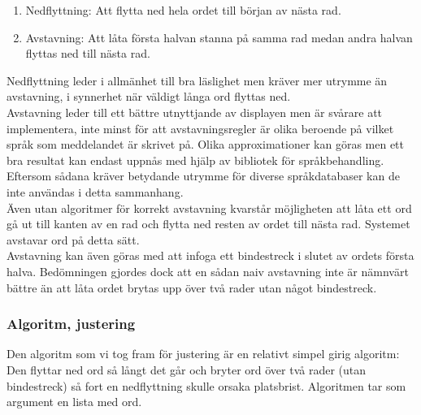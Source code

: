 \documentclass[a4paper,11pt]{article}
\begin{document}
	\begin{enumerate}
    	\item Nedflyttning: Att flytta ned hela ordet till början av nästa rad.
    	\item Avstavning: Att låta första halvan stanna på samma rad medan andra halvan flyttas ned till nästa rad.
	\end{enumerate}

Nedflyttning leder i allmänhet till bra läslighet men kräver mer utrymme än avstavning, i synnerhet när väldigt långa ord flyttas ned. \\

Avstavning leder till ett bättre utnyttjande av displayen men är svårare att implementera, inte minst för att avstavningsregler är olika beroende på vilket språk som meddelandet är skrivet på. Olika approximationer kan göras men ett bra resultat kan endast uppnås med hjälp av bibliotek för språkbehandling. Eftersom sådana kräver betydande utrymme för diverse språkdatabaser kan de inte användas i detta sammanhang. \\

Även utan algoritmer för korrekt avstavning kvarstår möjligheten att låta ett ord gå 
ut till kanten av en rad och flytta ned resten av ordet till nästa rad. Systemet avstavar ord på detta sätt. \\
    
Avstavning kan även göras med att infoga ett bindestreck i slutet av ordets första halva. Bedömningen gjordes dock att en sådan naiv avstavning inte är nämnvärt bättre än att låta ordet brytas upp över två rader utan något bindestreck.

\subsubsection{Algoritm, justering}
Den algoritm som vi tog fram för justering är en relativt simpel girig algoritm: Den flyttar ned ord så långt det går och bryter ord över två rader (utan bindestreck) så fort en nedflyttning skulle orsaka platsbrist. Algoritmen tar som argument en lista med ord. \\
\end{document}
